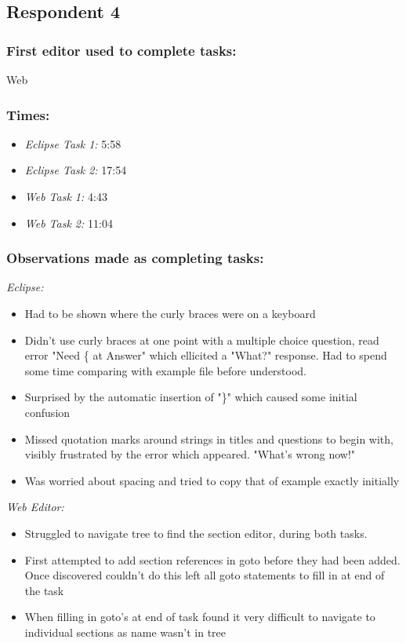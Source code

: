 \documentclass{report}
\begin{document}
\subsection{Respondent 4}
\subsubsection*{First editor used to complete tasks:} Web
\subsubsection*{Times:}
\begin{itemize}
\item \emph{Eclipse Task 1:} 5:58
\item \emph{Eclipse Task 2:} 17:54
\item \emph{Web Task 1:} 4:43
\item \emph{Web Task 2:} 11:04
\end{itemize}
\subsubsection*{Observations made as completing tasks:}

\emph{Eclipse:}
\begin{itemize}
\item Had to be shown where the curly braces were on a keyboard
\item Didn't use curly braces at one point with a multiple choice question, read error "Need \{ at Answer" which ellicited a "What?" response. Had to spend some time comparing with example file before understood.
\item Surprised by the automatic insertion of "\}" which caused some initial confusion
\item Missed quotation marks around strings in titles and questions to begin with, visibly frustrated by the error which appeared. "What's wrong now!"
\item Was worried about spacing and tried to copy that of example exactly initially 
\end{itemize}
\emph{Web Editor:}
\begin{itemize}
\item Struggled to navigate tree to find the section editor, during both tasks. 
\item First attempted to add section references in goto before they had been added. Once discovered couldn't do this left all goto statements to fill in at end of the task
\item When filling in goto's at end of task found it very difficult to navigate to individual sections as name wasn't in tree
\end{itemize}
\end{document}
